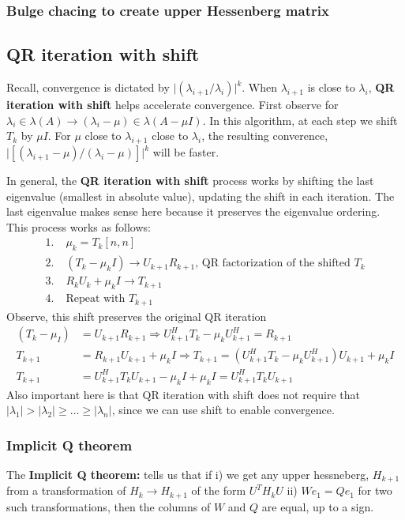 \documentclass{article}
\newcommand{\abs}[1]{\lvert#1\rvert}
\begin{document}
\subsubsection{Bulge chacing to create upper Hessenberg matrix}


\subsection{QR iteration with shift}
Recall, convergence is dictated by $\abs{(\lambda_{i+1} / \lambda_i)}^k$. When $\lambda_{i+1}$ is close to $\lambda_i$, \textbf{QR iteration with shift} helps accelerate convergence. First observe for $\lambda_i \in \lambda(A) \rightarrow (\lambda_i - \mu) \in \lambda(A - \mu I)$. In this algorithm, at each step we shift $T_k$ by $\mu I$. For $\mu$ close to $\lambda_{i+1}$ close to $\lambda_i$, the resulting converence, $\abs{[(\lambda_{i+1} - \mu) / (\lambda_i - \mu)]}^k$ will be faster.

In general, the \textbf{QR iteration with shift} process works by shifting the last eigenvalue (smallest in absolute value), updating the shift in each iteration. The last eigenvalue makes sense here because it preserves the eigenvalue ordering. This process works as follows:
\begin{align*}
    1. \;& \mu_k = T_k[n, n]\\
    2. \;& (T_k - \mu_k I) \longrightarrow U_{k+1}R_{k+1} \textrm{, QR factorization of the shifted } T_k\\
    3. \;& R_kU_k + \mu_k I \longrightarrow T_{k+1}\\
    4. \;& \textrm{Repeat with } T_{k+1}
\end{align*}
Observe, this shift preserves the original QR iteration
\begin{align*}
    (T_k - \mu_ I) &= U_{k+1}R_{k+1} \Longrightarrow U_{k+1}^HT_k - \mu_k U_{k+1}^H = R_{k+1}\\
    T_{k+1} &= R_{k+1}U_{k+1} + \mu_k I \Longrightarrow T_{k+1} = (U_{k+1}^HT_k - \mu_k U_{k+1}^H)U_{k+1} + \mu_k I\\
    T_{k+1} &= U_{k+1}^HT_kU_{k+1} - \mu_k I + \mu_k I = U_{k+1}^HT_kU_{k+1}
\end{align*}
Also important here is that QR iteration with shift does not require that $\abs{\lambda_1} > \abs{\lambda_2} \geq \dots \geq \abs{\lambda_n}$, since we can use shift to enable convergence.


\subsubsection{Implicit Q theorem}
The \textbf{Implicit Q theorem:} tells us that if i) we get any upper hessneberg, $H_{k+1}$ from a transformation of $H_k \rightarrow H_{k+1}$ of the form $U^TH_kU$ ii) $We_1 = Qe_1$ for two such transformations, then the columns of $W$ and $Q$ are equal, up to a sign.
\end{document}
